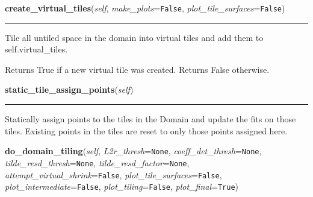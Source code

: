 \hspace{.8\funcindent}\begin{boxedminipage}{\funcwidth}

    \raggedright \textbf{create\_virtual\_tiles}(\textit{self}, \textit{make\_plots}={\tt False}, \textit{plot\_tile\_surfaces}={\tt False})

    \vspace{-1.5ex}

    \rule{\textwidth}{0.5\fboxrule}
\setlength{\parskip}{2ex}
    Tile all untiled space in the domain into virtual tiles and add them to
    self.virtual\_tiles.

    Returns True if a new virtual tile was created. Returns False 
    otherwise.

\setlength{\parskip}{1ex}
    \end{boxedminipage}

    \label{Tiling:Domain:static_tile_assign_points}

    \vspace{0.5ex}

\hspace{.8\funcindent}\begin{boxedminipage}{\funcwidth}

    \raggedright \textbf{static\_tile\_assign\_points}(\textit{self})

    \vspace{-1.5ex}

    \rule{\textwidth}{0.5\fboxrule}
\setlength{\parskip}{2ex}
    Statically assign points to the tiles in the Domain and update the fits
    on those tiles. Existing points in the tiles are reset to only those 
    points assigned here.

\setlength{\parskip}{1ex}
    \end{boxedminipage}

    \label{Tiling:Domain:do_domain_tiling}

    \vspace{0.5ex}

\hspace{.8\funcindent}\begin{boxedminipage}{\funcwidth}

    \raggedright \textbf{do\_domain\_tiling}(\textit{self}, \textit{L2r\_thresh}={\tt None}, \textit{coeff\_det\_thresh}={\tt None}, \textit{tilde\_resd\_thresh}={\tt None}, \textit{tilde\_resd\_factor}={\tt None}, \textit{attempt\_virtual\_shrink}={\tt False}, \textit{plot\_tile\_surfaces}={\tt False}, \textit{plot\_intermediate}={\tt False}, \textit{plot\_tiling}={\tt False}, \textit{plot\_final}={\tt True})

\setlength{\parskip}{2ex}
\setlength{\parskip}{1ex}
    \end{boxedminipage}


